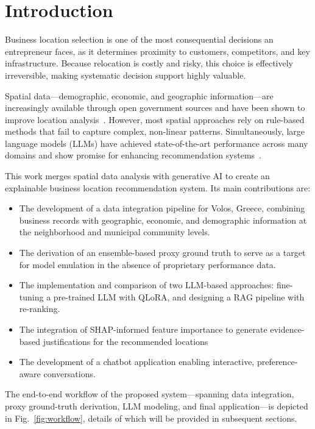 \documentclass[pdflatex,sn-mathphys-num]{sn-jnl}%
\theoremstyle{thmstyleone}%
\theoremstyle{thmstyletwo}%
\theoremstyle{thmstylethree}%
\begin{document}
\section{Introduction}\label{sec1}

Business location selection is one of the most consequential decisions an entrepreneur faces, as it determines proximity to customers, competitors, and key infrastructure. Because relocation is costly and risky, this choice is effectively irreversible, making systematic decision support highly valuable.

Spatial data---demographic, economic, and geographic information---are increasingly available through open government sources and have been shown to improve location analysis~\cite{han2024}. However, most spatial approaches rely on rule-based methods that fail to capture complex, non-linear patterns. Simultaneously, large language models (LLMs) have achieved state-of-the-art performance across many domains and show promise for enhancing recommendation systems~\cite{alhasan2024}.

This work merges spatial data analysis with generative AI to create an explainable business location recommendation system. Its main contributions are:
\begin{itemize}
    \item The development of a data integration pipeline for Volos, Greece, combining business records with geographic, economic, and demographic information at the neighborhood and municipal community levels.
    \item The derivation of an ensemble-based proxy ground truth to serve as a target for model emulation in the absence of proprietary performance data.
    \item The implementation and comparison of two LLM-based approaches: fine-tuning a pre-trained LLM with QLoRA, and designing a RAG pipeline with re-ranking.
    \item The integration of SHAP-informed feature importance to generate evidence-based justifications for the recommended locations
    \item The development of a chatbot application enabling interactive, preference-aware conversations.
\end{itemize}

The end-to-end workflow of the proposed system—spanning data integration, proxy ground-truth derivation, LLM modeling, and final application—is depicted in Fig.~\ref{fig:workflow}, details of which will be provided in subsequent sections.
\end{document}
